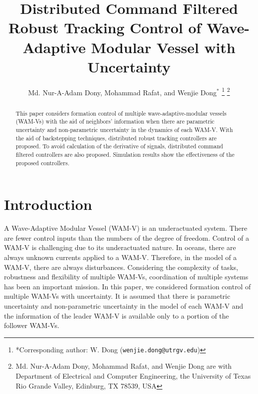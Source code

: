 \documentclass[letterpaper, 10 pt, conference]{ieeeconf}  %
\title{Distributed Command Filtered  Robust Tracking Control of Wave-Adaptive Modular Vessel with Uncertainty}
\author{Md. Nur-A-Adam Dony, Mohammad Rafat,  and Wenjie Dong$^*$%
\thanks{*Corresponding author: W. Dong 
        ({\tt\small wenjie.dong@utrgv.edu})}%
\thanks{Md. Nur-A-Adam Dony, Mohammad Rafat, and Wenjie Dong are with Department of Electrical and Computer Engineering, the University of Texas Rio Grande Valley,
Edinburg, TX 78539, USA}%
}
\begin{document}
\maketitle
\begin{abstract} This paper considers formation control of multiple wave-adaptive-modular vessels (WAM-Vs) with the aid of neighbors' information when there are parametric uncertainty and non-parametric uncertainty in the dynamics of each WAM-V. With the aid of backstepping techniques,  distributed robust tracking controllers are proposed. To avoid calculation of the derivative of signals, distributed command filtered controllers are also proposed.  
 Simulation results show the effectiveness of the proposed controllers.
\end{abstract}

\section{Introduction}


A Wave-Adaptive Modular Vessel (WAM-V) is an underactuated system. There are fewer control inputs than the numbers of the degree of freedom. Control of a WAM-V is challenging due to its underactuated nature. In oceans, there are always unknown currents applied to a WAM-V. Therefore, in the model of a WAM-V, there are always disturbances.
Considering the complexity of tasks, robustness and flexibility of multiple WAM-Vs, coordination of multiple systems has been an important mission. In this paper, we considered formation control of multiple WAM-Vs with uncertainty. It is assumed that there is parametric uncertainty and non-parametric uncertainty in the model of each WAM-V and the information of the leader WAM-V is available only to a portion of the follower WAM-Vs.
\end{document}
